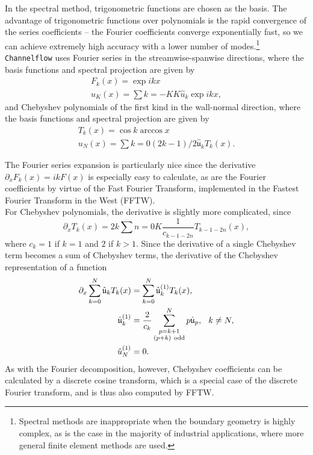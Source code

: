 In the spectral method, trigonometric functions are chosen as the basis. The advantage of trigonometric functions over polynomials is the rapid convergence of the series coefficients -- the Fourier coefficients converge exponentially fast, so we can achieve extremely high accuracy with a lower number of modes.\footnote{Spectral methods are inappropriate when the boundary geometry is highly complex, as is the case in the majority of industrial applications, where more general finite element methods are used.} {\tt Channelflow} uses Fourier series in the streamwise-spanwise directions, where the basis functions and spectral projection are given by 
\begin{align}
F_k(x) = \exp{ikx}\\
u_K(x) = \sum{k=-K}{K}\hat{u}_k\exp{ikx},
\end{align}
and Chebyshev polynomials of the first kind in the wall-normal direction, where the basis functions and spectral projection are given by
\begin{align}
T_k(x) = \cos{k\arccos{x}}\\
u_N(x) = \sum{k=0}{(2k-1)/2}\hat{\mathfrak{u}}_kT_k(x).
\end{align}
\par The Fourier series expansion is particularly nice since the derivative $\partial_x F_k(x) = ikF(x)$ is especially easy to calculate, as are the Fourier coefficients by virtue of the Fast Fourier Transform, implemented in the Fastest Fourier Transform in the West (FFTW).\\

For Chebyshev polynomials, the derivative is slightly more complicated, since 
\begin{equation}
\partial_x T_k(x) = 2k\sum{n=0}{K}{\frac{1}{c_{k-1-2n}} T_{k-1-2n}(x)},
\end{equation}
where $c_k = 1$ if $k=1$ and $2$ if $k > 1$. Since the derivative of a single Chebyshev term becomes a sum of Chebyshev terms, the derivative of the Chebyshev representation of a function 
\begin{align}
\partial_x \sum{k=0}{N}\hat{\mathfrak{u}}_kT_k(x) &= \sum{k=0}{N}\hat{\mathfrak{u}}_k^{(1)}T_k(x),\\
\hat{\mathfrak{u}}_k^{(1)} &= \frac{2}{c_k}\sum{\substack{p = k+1\\(p+k) \mathrm{~odd}}}{N} p \hat{\mathfrak{u}}_p, \hspace{0.25cm} k \neq N,\\
\hat{u}^{(1)}_N &= 0.
\end{align}
As with the Fourier decomposition, however, Chebyshev coefficients can be calculated by a discrete cosine transform, which is a special case of the discrete Fourier transform, and is thus also computed by FFTW. 

